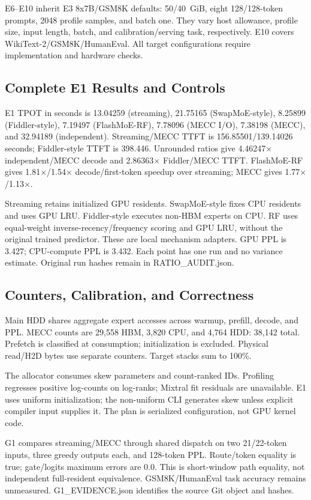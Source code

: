 E6--E10 inherit E3 8x7B/GSM8K defaults: 50/40~GiB, eight 128/128-token prompts, 2048 profile samples, and batch one. They vary host allowance, profile size, input length, batch, and calibration/serving task, respectively. E10 covers WikiText-2/GSM8K/HumanEval. All target configurations require implementation and hardware checks.

\subsection{Complete E1 Results and Controls}
E1 TPOT in seconds is 13.04259 (streaming), 21.75165 (SwapMoE-style), 8.25899 (Fiddler-style), 7.19497 (FlashMoE-RF), 7.78096 (MECC I/O), 7.38198 (MECC), and 32.94189 (independent). Streaming/MECC TTFT is 156.85501/139.14026 seconds; Fiddler-style TTFT is 398.446. Unrounded ratios give 4.46247$\times$ independent/MECC decode and 2.86363$\times$ Fiddler/MECC TTFT. FlashMoE-RF gives 1.81$\times$/1.54$\times$ decode/first-token speedup over streaming; MECC gives 1.77$\times$/1.13$\times$.

Streaming retains initialized GPU residents. SwapMoE-style fixes CPU residents and uses GPU LRU. Fiddler-style executes non-HBM experts on CPU. RF uses equal-weight inverse-recency/frequency scoring and GPU LRU, without the original trained predictor. These are local mechanism adapters. GPU PPL is 3.427; CPU-compute PPL is 3.432. Each point has one run and no variance estimate. Original run hashes remain in RATIO\_AUDIT.json.

\subsection{Counters, Calibration, and Correctness}
Main HDD shares aggregate expert accesses across warmup, prefill, decode, and PPL. MECC counts are 29,558 HBM, 3,820 CPU, and 4,764 HDD: 38,142 total. Prefetch is classified at consumption; initialization is excluded. Physical read/H2D bytes use separate counters. Target stacks sum to 100\%.

The allocator consumes skew parameters and count-ranked IDs. Profiling regresses positive log-counts on log-ranks; Mixtral fit residuals are unavailable. E1 uses uniform initialization; the non-uniform CLI generates skew unless explicit compiler input supplies it. The plan is serialized configuration, not GPU kernel code.

G1 compares streaming/MECC through shared dispatch on two 21/22-token inputs, three greedy outputs each, and 128-token PPL. Route/token equality is true; gate/logits maximum errors are 0.0. This is short-window path equality, not independent full-resident equivalence. GSM8K/HumanEval task accuracy remains unmeasured. G1\_EVIDENCE.json identifies the source Git object and hashes.

